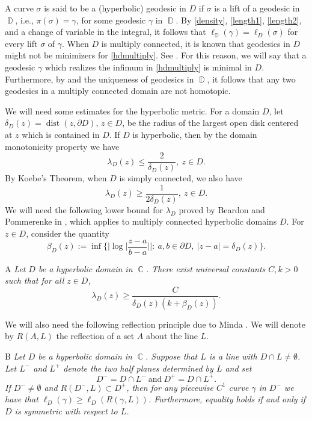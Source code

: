 \documentclass[11pt, letterpaper,leqno]{amsart}
\numberwithin{equation}{section}
\theoremstyle{definition}
\DeclareMathOperator{\D}{\mathbb{D}}
\DeclareMathOperator{\C}{\mathbb{C}}
\DeclareMathOperator{\dist}{\mathrm{dist}}
\begin{document}
A curve $\sigma$ is said to be a (hyperbolic) geodesic in $D$ if $\sigma$ is a lift of a geodesic in $\D$, i.e., $\pi(\sigma)=\gamma$, for some  geodesic $\gamma$ in $\D$. By \eqref{density}, \eqref{length1},  \eqref{length2}, and a change of variable in the integral, it follows that $\ell_{\D}(\gamma)=\ell_D(\sigma)$ for every lift $\sigma$ of $\gamma$. When $D$ is multiply connected, it is known that geodesics in $D$ might not be minimizers for \eqref{hdmultiply}. See \cite[Proposition 1.9.30]{Abate}. For this reason, we will say that a geodesic $\gamma$ which realizes the infimum in \eqref{hdmultiply} is minimal in $D$. Furthermore, by \cite[Theorem 14.12 (iii), (iv)]{Mar} and the uniqueness of geodesics in $\D$, it follows that any two geodesics in a multiply connected domain are not homotopic.

We will need some estimates for the hyperbolic metric. For a domain $D$, let $\delta_D(z)=\dist(z,\partial D)$, $z\in D$, be the radius of the largest open disk centered at $z$ which is contained in $D$. If $D$ is hyperbolic, then by the domain monotonicity property we have
\begin{equation}\label{upperlambda}
	\lambda_D(z)\leq\frac{2}{\delta_D(z)}, \ z\in D.
\end{equation}
By Koebe's Theorem, when $D$ is simply connected, we also have
\[
\lambda_D(z)\geq\frac{1}{2\delta_D(z)}, \ z\in D.
\]
We will need the following lower bound for $\lambda_D$ proved by Beardon and Pommerenke in \cite{BP}, which applies to multiply connected hyperbolic domains $D$. For $z\in D$, consider the quantity
\begin{equation}\label{beta}
\beta_D(z):=\inf\Biggl\{\Bigg|\log\bigg|\frac{z-a}{b-a}\bigg|\Bigg|:\ a, b\in\partial D,\ |z-a|=\delta_D(z)\Biggr\}.
\end{equation}


\begin{customthm}{A}\label{TheoremA}
\textit{
Let $D$ be a hyperbolic domain in $\C$. There exist universal constants $C,k>0$ such that for all $z\in D$,
\begin{equation}
	\lambda_D(z)\geq \frac{C}{\delta_D(z)\left(k+\beta_D(z)\right)}.
\end{equation}
}
\end{customthm}

We will also need the following reflection principle due to Minda \cite[Theorem 3]{Minda}. We will denote by $R(A,L)$ the reflection of a set $A$ about the line $L$.

\begin{customthm}{B}\label{TheoremB}
	\textit{
		Let $D$ be a hyperbolic domain in $\C$. Suppose that $L$ is a line with $D\cap L\neq \emptyset$. Let $L^{-}$ and $L^{+}$ denote the two half planes determined by $L$ and set
		\[
		D^{-}=D\cap L^{-}\ \textrm{and}\ D^{+}=D\cap L^{+}.
		\] 
		If $D^{-}\neq\emptyset$ and $R(D^{-}, L)\subset D^{+}$, then for any piecewise $C^1$ curve $\gamma$ in $D^{-}$ we have that $\ell_D(\gamma)\geq \ell_D\left(R(\gamma, L)\right)$. Furthermore, equality holds if and only if $D$ is symmetric with respect to $L$.
	}
\end{customthm}
\end{document}
